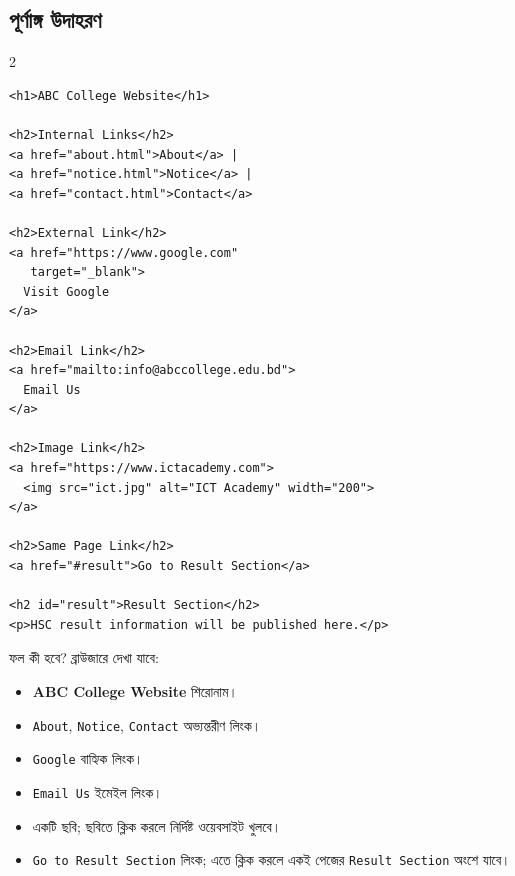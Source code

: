 \subsection{পূর্ণাঙ্গ উদাহরণ}

\par{}\par
\begin{multicols}{2}
\begin{verbatim}
<h1>ABC College Website</h1>

<h2>Internal Links</h2>
<a href="about.html">About</a> |
<a href="notice.html">Notice</a> |
<a href="contact.html">Contact</a>

<h2>External Link</h2>
<a href="https://www.google.com"
   target="_blank">
  Visit Google
</a>

<h2>Email Link</h2>
<a href="mailto:info@abccollege.edu.bd">
  Email Us
</a>

<h2>Image Link</h2>
<a href="https://www.ictacademy.com">
  <img src="ict.jpg" alt="ICT Academy" width="200">
</a>

<h2>Same Page Link</h2>
<a href="#result">Go to Result Section</a>

<h2 id="result">Result Section</h2>
<p>HSC result information will be published here.</p>
\end{verbatim}
\end{multicols}


\begin{examplebox}{ফল কী হবে?}
ব্রাউজারে দেখা যাবে:
\par\noindent
\begin{minipage}[t]{.48\linewidth}\vspace{0pt}
\begin{itemize}
\item \textbf{ABC College Website} শিরোনাম।
\item \texttt{About}, \texttt{Notice}, \texttt{Contact} অভ্যন্তরীণ লিংক।
\item \texttt{Google} বাহ্যিক লিংক।
\end{itemize}
\end{minipage}\hfill
\begin{minipage}[t]{.48\linewidth}\vspace{0pt}
\begin{itemize}
\item \texttt{Email Us} ইমেইল লিংক।
\item একটি ছবি; ছবিতে ক্লিক করলে নির্দিষ্ট ওয়েবসাইট খুলবে।
\item \texttt{Go to Result Section} লিংক; এতে ক্লিক করলে একই পেজের \texttt{Result Section} অংশে যাবে।
\end{itemize}
\end{minipage}\par

\end{examplebox}

